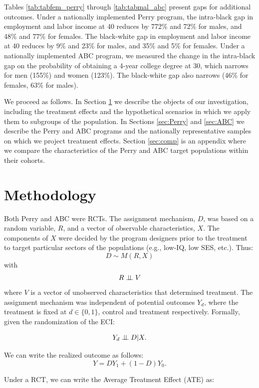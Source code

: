 Tables \ref{tab:tabfem_perry} through \ref{tab:tabmal_abc} present gaps for additional outcomes. 
Under a nationally implemented Perry program, the intra-black gap in employment and labor income at 40 reduces by 772\% and 72\% for males, and 48\% and 77\% for females. The black-white gap in employment and labor income at 40 reduces by 9\% and 23\% for males, and 35\% and 5\% for females. 
Under a nationally implemented ABC program, we measured the change in the intra-black gap on the probability of obtaining a 4-year college degree at 30, which narrows for men (155\%) and women (123\%). The black-white gap also narrows (46\% for females, 63\% for males).


 
\restoregeometry

%
%

We proceed as follows. In Section \ref{sec:Meth} we describe the objects of our investigation, including the treatment effects and the hypothetical scenarios in which we apply them to subgroups of the population. In Sections  \ref{sec:Perry} and \ref{sec:ABC} we describe the Perry and ABC programs and the nationally representative samples on which we project treatment effects. Section \ref{sec:comp} is an appendix where we compare the characteristics of the Perry and ABC target populations within their cohorts.

\section{Methodology} \label{sec:Meth}
Both Perry and ABC were RCTs. The assignment mechanism, $D$, was based on a random variable, $R$, and a vector of observable characteristics, $X$. The components of $X$ were decided by the program designers prior to the treatment to target particular sectors of the populations (e.g., low-IQ, low SES, etc.). Thus:
\[
D\sim M(R,X)
\]
with
\[
R\perp\!\!\!\perp V
\]
where $V$ is a vector of unobserved characteristics that determined treatment. The assignment mechanism was independent of potential outcomes $Y_{d}$, where the treatment is fixed at $d \in \{0,1\}$, control and treatment respectively. Formally, given the randomization of the ECI:

\[
Y_d \perp\!\!\!\perp D|X.
\]

\noindent We can write the realized outcome as follows:
\[
Y=DY_{1}+\left(1-D\right)Y_{0}.
\]

\noindent Under a RCT, we can write the Average Treatment Effect (ATE) as:

